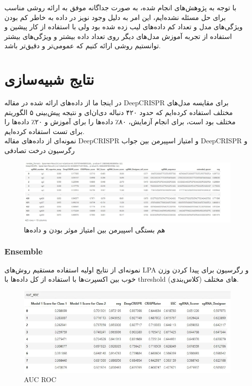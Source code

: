 \documentclass[12pt,a4paper,BCOR=.7cm,headsepline,bibliography=totoc]{report}
\begin{document}
با توجه به پژوهش‌های انجام شده، به صورت جداگانه موفق به ارائه روشی مناسب برای حل مسئله نشده‌ایم، این امر به دلیل وجود نویز در داده به خاطر کم بودن ویژگی‌های مدل و تعداد کم داده‌های لیب زده شده بود ولی با استفاده از کار پیشین و استفاده از تجربه آموزش مدل‌های دیگر روی تعداد داده بیشتر و ویژگی‌های بیشتر توانستیم روشی ارائه کنیم که عمومی‌تر و دقیق‌تر باشد.
\chapter{نتایج شبیه‌سازی}
در اینجا ما از داده‌های ارائه شده در مقاله DeepCRISPR برای مقایسه مدل‌های مختلف استفاده کرده‌ایم که حدود ۴۲۰ دنباله دی‌ان‌ای و نتیجه پیش‌بینی ۵ الگوریتم مختلف بود است، برای انجام آزمایش، ۸۰٪ داده‌ها را برای آموزش و ۲۰٪ داد‌ه‌ها را برای تست استفاده کرده‌ایم.\\

نمونه‌ای از داده‌های مقاله DeepCRISPR و امتیاز اسپیرمن بین جواب DeepCRISPR و رگرسیون درخت تصادفی
\begin{figure}[H]
\centering
\includegraphics[width=18cm, ]{pictures/DeepCRISPR_Data.jpg}
\caption{
هم بستگی اسپیرمن بین امتیاز موثر بودن و داده‌ها
}\label{wrap-fig:4}
\end{figure}
\subsection{Ensemble}
  نمونه‌ای از نتایج اولیه استفاده مستقیم روش‌های LPA و رگرسیون برای پیدا کردن وزن خوب بین اکسپرت‌ها با استفاده از کل داده‌ها با threshold های مختلف (کلاس‌بندی).
\begin{figure}[H]
\centering
\includegraphics[width=15cm, ]{pictures/DeepCRISPR_AUR.jpg}
\caption{
AUC ROC
}\label{wrap-fig:4}
\end{figure}
\end{document}
